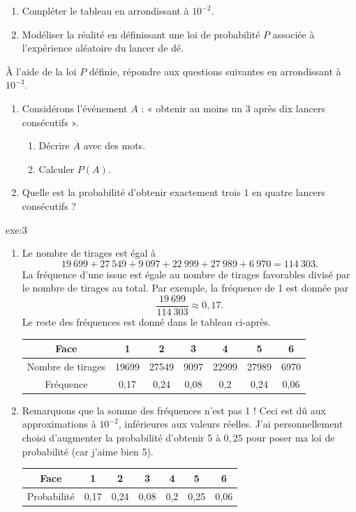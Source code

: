 {	\begin{enumerate}
		\item
		Compléter le tableau en arrondissant à $10^{-2}$.
		\item
		Modéliser la réalité en définissant une loi de probabilité $P$ associée à l'expérience aléatoire du lancer de dé.
	\end{enumerate}
	À l'aide de la loi $P$ définie, répondre aux questions suivantes en arrondissant à $10^{-3}$.
	\begin{enumerate}[resume]
		\item Considérons l'événement $A$ : « obtenir au moins un $3$ après dix lancers consécutifs ».
			\begin{enumerate}
				\item Décrire $\overline{A}$ avec des mots.
				\item Calculer $P(A)$.
			\end{enumerate}
		\item Quelle est la probabilité d'obtenir exactement trois $1$ en quatre lancers consécutifs ?
	\end{enumerate}
}{exe:3}{
	\begin{enumerate}
		\item
		Le nombre de tirages est égal à
			\[ 19~699 + 27~549 + 9~097 + 22~999 + 27~989 + 6~970 = 114~303. \]
		La fréquence d'une issue est égale au nombre de tirages favorables divisé par le nombre de tirages au total.
		Par exemple, la fréquence de 1 est donnée par
			\[ \frac{19~699}{114~303} \approx 0,17. \]
		Le reste des fréquences est donné dans le tableau ci-après.
		\begin{center}
		\begin{tabular}{|c|c|c|c|c|c|c|} \hline
			Face & 1 & 2 & 3 & 4 & 5 & 6 \\ \hline
			Nombre de tirages & 19699 & 27549 & 9097 & 22999 & 27989 & 6970  \\ \hline
			Fréquence & 0,17 & 0,24 & 0,08 & 0,2 & 0,24 &  0,06 \\ \hline
		\end{tabular}
		\end{center}
		\item
		Remarquons que la somme des fréquences n'est pas 1 ! Ceci est dû aux approximations à $10^{-2}$, inférieures aux valeurs réelles.
		J'ai personnellement choisi d'augmenter la probabilité d'obtenir 5 à $0,25$ pour poser ma loi de probabilité (car j'aime bien 5).
		\begin{center}
		\begin{tabular}{|c|c|c|c|c|c|c|} \hline
			Face & 1 & 2 & 3 & 4 & 5 & 6 \\ \hline
			Probabilité & 0,17 & 0,24 & 0,08 & 0,2 & 0,25 &  0,06 \\ \hline
		\end{tabular}
		\end{center}
		

\end{enumerate}}
